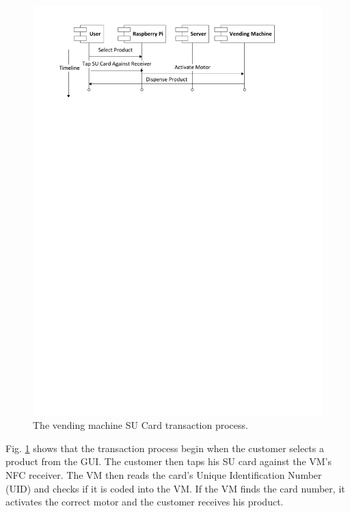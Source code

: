 \begin{figure}
 \centering 
 \includegraphics[clip=true, trim = 0 650 0 40,
 scale=0.7]{su_card_transaction_processflow}
 \caption{The vending machine SU Card transaction process.}
 \label{fig:vm_su_interaction}
\end{figure}

Fig. \ref{fig:vm_su_interaction} shows that the transaction process begin when the
customer selects a product from the GUI. The customer then taps his SU card against the
VM's NFC receiver. The VM then reads the card's Unique Identification Number
(UID) and checks if it is coded into the VM. If the VM finds the card number, it
activates the correct motor and the customer receives his product.